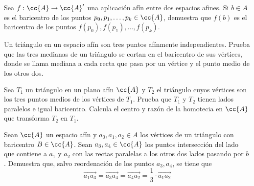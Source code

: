 \begin{ejercicio}
    Sea $f : \cc{A} \to \cc{A}'$ una aplicación afín entre dos espacios afines. Si $b \in A$ es el baricentro de los puntos $p_0, p_1, \dots , p_k \in \cc{A}$, demuestra que $f (b)$ es el baricentro de los puntos $f (p_0), f (p_1), \dots , f (p_k)$.
\end{ejercicio}

\begin{ejercicio}
    Un triángulo en un espacio afín son tres puntos afínmente independientes. Prueba que las tres medianas de un triángulo se cortan en el baricentro de sus vértices, donde se llama mediana a cada recta que pasa por un vértice y el punto medio de los otros dos.
\end{ejercicio}

\begin{ejercicio}
    Sea $T_1$ un triángulo en un plano afín $\cc{A}$ y $T_2$ el triángulo cuyos vértices son los tres puntos medios de los vértices de $T_1$. Prueba que $T_1$ y $T_2$ tienen lados paralelos e igual baricentro. Calcula el centro y razón de la homotecia en $\cc{A}$ que transforma $T_2$ en $T_1$.
\end{ejercicio}

\begin{ejercicio}
    Sean $\cc{A}$ un espacio afín y $a_0, a_1, a_2 \in A$ los vértices de un triángulo con baricentro $B \in \cc{A}$. Sean $a_3, a_4 \in \cc{A}$ los puntos intersección del lado que contiene a $a_1$ y $a_2$ con las rectas paralelas a los otros dos lados pasando por $b$. Demuestra que, salvo reordenación de los puntos $a_3, a_4$, se tiene que
    \begin{equation*}
        \vec{a_1a_3} = \vec{a_3a_4}= \vec{a_4a_2} = \frac{1}{3} \cdot \vec{a_1a_2}
    \end{equation*}
\end{ejercicio}

